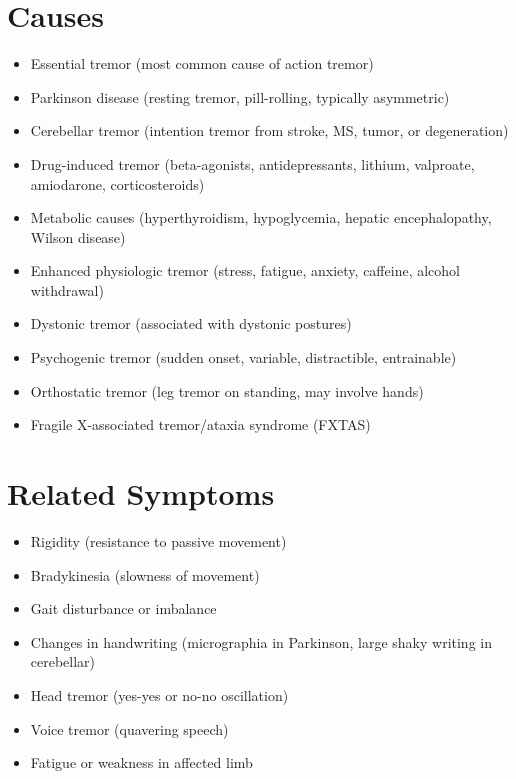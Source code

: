 \section*{Causes}
\begin{itemize}
  \item Essential tremor (most common cause of action tremor)
  \item Parkinson disease (resting tremor, pill-rolling, typically asymmetric)
  \item Cerebellar tremor (intention tremor from stroke, MS, tumor, or degeneration)
  \item Drug-induced tremor (beta-agonists, antidepressants, lithium, valproate, amiodarone, corticosteroids)
  \item Metabolic causes (hyperthyroidism, hypoglycemia, hepatic encephalopathy, Wilson disease)
  \item Enhanced physiologic tremor (stress, fatigue, anxiety, caffeine, alcohol withdrawal)
  \item Dystonic tremor (associated with dystonic postures)
  \item Psychogenic tremor (sudden onset, variable, distractible, entrainable)
  \item Orthostatic tremor (leg tremor on standing, may involve hands)
  \item Fragile X-associated tremor/ataxia syndrome (FXTAS)
\end{itemize}

\section*{Related Symptoms}
\begin{itemize}
  \item Rigidity (resistance to passive movement)
  \item Bradykinesia (slowness of movement)
  \item Gait disturbance or imbalance
  \item Changes in handwriting (micrographia in Parkinson, large shaky writing in cerebellar)
  \item Head tremor (yes-yes or no-no oscillation)
  \item Voice tremor (quavering speech)
  \item Fatigue or weakness in affected limb
\end{itemize}

